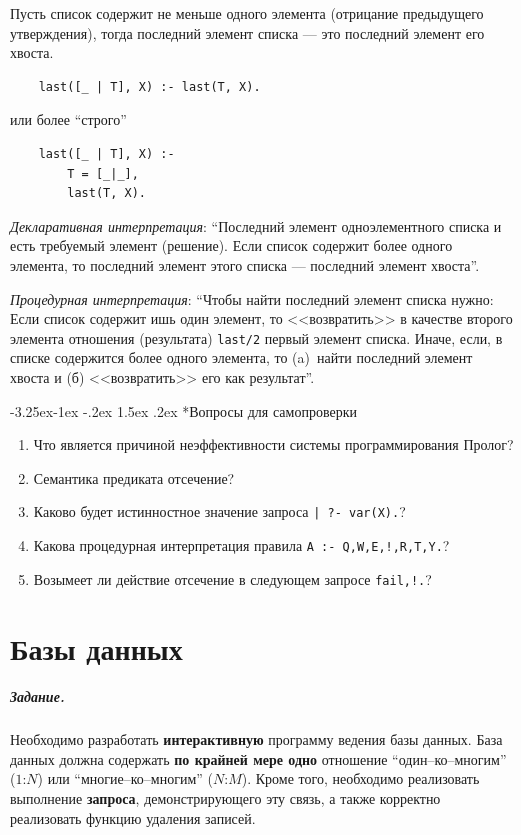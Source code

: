 \documentclass[12pt, openany, oneside]{book} %
\makeatletter
\renewcommand\subsubsection{\@startsection{subsubsection}{3}{\z@}%
                                     {-3.25ex\@plus -1ex \@minus -.2ex}%
                                     {1.5ex \@plus .2ex}%
                                     {\normalfont\normalsize\bfseries}}
\newenvironment{questions}{\subsubsection*{Вопросы для самопроверки}\begin{enumerate}}{\end{enumerate}}
\makeatother
\begin{document}
Пусть список содержит не меньше одного элемента (отрицание предыдущего утверждения), тогда последний элемент списка --- это последний элемент его хвоста.

{\tt\begin{verbatim}
    last([_ | T], X) :- last(T, X).
\end{verbatim}}
\noindent или более ``строго''
{\tt\begin{verbatim}
    last([_ | T], X) :-
        T = [_|_],
        last(T, X).
\end{verbatim}}\emph{Декларативная интерпретация}: ``Последний элемент одноэлементного списка и есть требуемый элемент (решение). Если список содержит более одного элемента, то последний элемент этого списка --- последний элемент хвоста''.

\emph{Процедурная интерпретация}: ``Чтобы найти последний элемент списка нужно: Если список содержит ишь один элемент, то <<возвратить>> в качестве второго элемента отношения (результата) {\tt last/2} первый элемент списка. Иначе, если, в списке содержится более одного элемента, то (a)~найти последний элемент хвоста и (б) <<возвратить>> его как результат''.

\begin{questions}
\item{} Что является причиной неэффективности системы программирования Пролог?
\item{} Семантика предиката отсечение?
\item{} Каково будет истинностное значение запроса \texttt{| ?- var(X).}?
\item{} Какова процедурная интерпретация правила \texttt{A :- Q,W,E,!,R,T,Y.}?
\item{} Возымеет ли действие отсечение в следующем запросе \texttt{fail,!.}?
\end{questions}

\chapter{Базы данных}
\paragraph{Задание.} Необходимо разработать {\bf интерактивную} программу ведения базы данных. База данных должна содержать {\bf по крайней мере одно} отношение ``один--ко--многим'' ($1$:$N$) или ``многие--ко--многим'' ($N$:$M$). Кроме того, необходимо реализовать выполнение {\bf запроса}, демонстрирующего эту связь, а также корректно реализовать функцию удаления записей.
\end{document}
